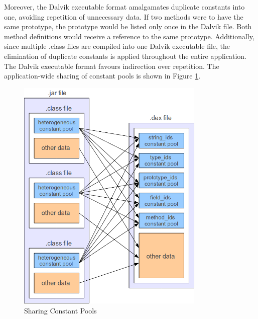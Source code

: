 Moreover, the Dalvik executable format amalgamates duplicate constants into one, avoiding repetition of unnecessary data. If two methods were to have the same prototype, the prototype would be listed only once in the Dalvik file. Both method definitions would receive a reference to the same prototype. Additionally, since multiple .class files are compiled into one Dalvik executable file, the elimination of duplicate constants is applied throughout the entire application. The Dalvik executable format favours indirection over repetition. The application-wide sharing of constant pools is shown in Figure \ref{fig:dex}.

\begin{figure}[h!]
    \centering
    \includegraphics[width=0.8\textwidth]{images/dex.png}
    \caption{Sharing Constant Pools}
    \label{fig:dex}
\end{figure}

